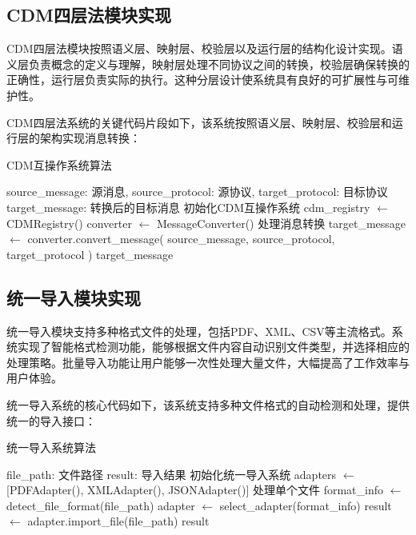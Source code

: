 \subsection{CDM四层法模块实现}

CDM四层法模块按照语义层、映射层、校验层以及运行层的结构化设计实现。语义层负责概念的定义与理解，映射层处理不同协议之间的转换，校验层确保转换的正确性，运行层负责实际的执行。这种分层设计使系统具有良好的可扩展性与可维护性。

CDM四层法系统的关键代码片段如下，该系统按照语义层、映射层、校验层和运行层的架构实现消息转换：

\begin{algorithm}[H]
\caption{CDM互操作系统算法}
\begin{algorithmic}[1]
\REQUIRE source\_message: 源消息, source\_protocol: 源协议, target\_protocol: 目标协议
\ENSURE target\_message: 转换后的目标消息
\STATE 初始化CDM互操作系统
\STATE cdm\_registry $\leftarrow$ CDMRegistry()
\STATE converter $\leftarrow$ MessageConverter()
\STATE 处理消息转换
\STATE target\_message $\leftarrow$ converter.convert\_message(
\STATE     source\_message, source\_protocol, target\_protocol
\STATE )
\RETURN target\_message
\end{algorithmic}
\end{algorithm}

\subsection{统一导入模块实现}

统一导入模块支持多种格式文件的处理，包括PDF、XML、CSV等主流格式。系统实现了智能格式检测功能，能够根据文件内容自动识别文件类型，并选择相应的处理策略。批量导入功能让用户能够一次性处理大量文件，大幅提高了工作效率与用户体验。

统一导入系统的核心代码如下，该系统支持多种文件格式的自动检测和处理，提供统一的导入接口：

\begin{algorithm}[H]
\caption{统一导入系统算法}
\begin{algorithmic}[1]
\REQUIRE file\_path: 文件路径
\ENSURE result: 导入结果
\STATE 初始化统一导入系统
\STATE adapters $\leftarrow$ [PDFAdapter(), XMLAdapter(), JSONAdapter()]
\STATE 处理单个文件
\STATE format\_info $\leftarrow$ detect\_file\_format(file\_path)
\STATE adapter $\leftarrow$ select\_adapter(format\_info)
\STATE result $\leftarrow$ adapter.import\_file(file\_path)
\RETURN result
\end{algorithmic}
\end{algorithm}

